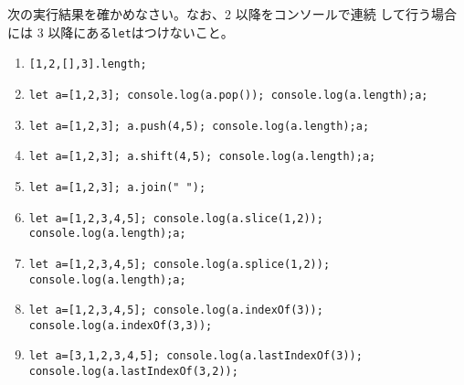\begin{Prob}\upshape\Must
 次の実行結果を確かめなさい。なお、2 以降をコンソールで連続
 して行う場合には 3 以降にある\texttt{let}はつけないこと。
\begin{enumerate}\upshape
 \item \texttt{[1,2,[],3].length;}
 \item \texttt{let a=[1,2,3]; console.log(a.pop());
       console.log(a.length);a;}
 \item \texttt{let a=[1,2,3]; a.push(4,5); console.log(a.length);a;}
 \item \texttt{let a=[1,2,3]; a.shift(4,5); console.log(a.length);a;}
 \item \texttt{let a=[1,2,3]; a.join(" ");}
 \item \texttt{let a=[1,2,3,4,5]; console.log(a.slice(1,2)); console.log(a.length);a;}
 \item \texttt{let a=[1,2,3,4,5]; console.log(a.splice(1,2)); console.log(a.length);a;}
 \item \texttt{let a=[1,2,3,4,5]; console.log(a.indexOf(3)); console.log(a.indexOf(3,3));}
 \item \texttt{let a=[3,1,2,3,4,5]; console.log(a.lastIndexOf(3));
       console.log(a.lastIndexOf(3,2));}%
\end{enumerate}
\end{Prob}
